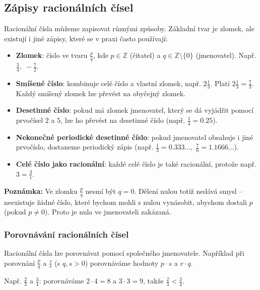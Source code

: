 \documentclass[12pt,a4paper]{article}
\begin{document}
\subsection*{Zápisy racionálních čísel}

Racionální čísla můžeme zapisovat různými způsoby. Základní tvar je zlomek, ale existují i jiné zápisy, které se v praxi často používají:  

\begin{itemize}
    \item \textbf{Zlomek}: číslo ve tvaru $\tfrac{p}{q}$, kde $p \in \mathbb{Z}$ (čitatel) a $q \in \mathbb{Z}\setminus \{0\}$ (jmenovatel). Např. $\tfrac{3}{4}, \; -\tfrac{7}{2}$.  
    \item \textbf{Smíšené číslo}: kombinuje celé číslo a vlastní zlomek, např. $2\tfrac{1}{3}$. Platí $2\tfrac{1}{3}=\tfrac{7}{3}$. Každý smíšený zlomek lze převést na obyčejný zlomek.  
    \item \textbf{Desetinné číslo}: pokud má zlomek jmenovatel, který se dá vyjádřit pomocí prvočísel $2$ a $5$, lze ho převést na desetinné číslo (např. $\tfrac{1}{4}=0.25$).  
    \item \textbf{Nekonečné periodické desetinné číslo}: pokud jmenovatel obsahuje i jiné prvočíslo, dostaneme periodický zápis (např. $\tfrac{1}{3}=0.333\dots, \; \tfrac{7}{6}=1.1666\dots$).  
    \item \textbf{Celé číslo jako racionální}: každé celé číslo je také racionální, protože např. $3 = \tfrac{3}{1}$.  
\end{itemize}

\begin{notebox}
\textbf{Poznámka:} Ve zlomku $\tfrac{p}{q}$ nesmí být $q=0$. Dělení nulou totiž nedává smysl – neexistuje žádné číslo, které bychom mohli s nulou vynásobit, abychom dostali $p$ (pokud $p\neq 0$). Proto je nula ve jmenovateli zakázaná.
\end{notebox}


\subsubsection*{Porovnávání racionálních čísel}
Racionální čísla lze porovnávat pomocí společného jmenovatele. Například při porovnání $\tfrac{p}{q}$ a $\tfrac{r}{s}$ (s $q,s > 0$) porovnáváme hodnoty $p \cdot s$ a $r \cdot q$.  

Např. $\tfrac{2}{3}$ a $\tfrac{3}{4}$: porovnáváme $2\cdot 4 = 8$ a $3 \cdot 3 = 9$, takže $\tfrac{2}{3} < \tfrac{3}{4}$.
\end{document}
